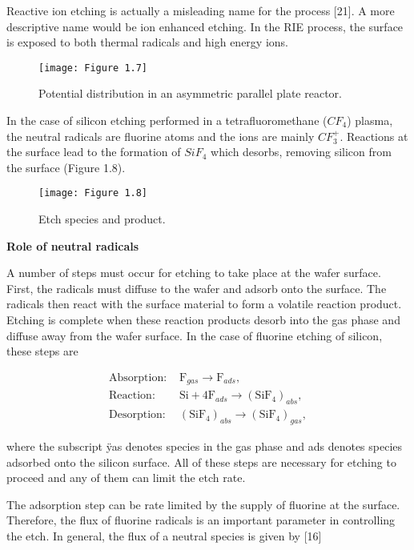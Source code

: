\tab Reactive ion etching is actually a misleading name for the process [21]. A more descriptive name would be ion enhanced etching. In the RIE process, the surface is exposed to both thermal radicals and high energy ions.

\begin{figure}[H]
	\centering
	\texttt{[image: Figure 1.7]}
	\bf\caption{Potential distribution in an asymmetric parallel plate reactor.}
	\label{fig:1.7}
\end{figure}

\noindent In the case of silicon etching performed in a tetrafluoromethane ($CF_{4}$) plasma, the neutral radicals are fluorine atoms and the ions are mainly $CF^{+}_{3}$. Reactions at the surface lead to the formation of $SiF_{4}$ which desorbs, removing silicon from the surface (Figure 1.8).

\begin{figure}[H]
	\centering
	\texttt{[image: Figure 1.8]}
	\bf\caption{Etch species and product.}
	\label{fig:1.8}
\end{figure}

\large\bf Role of neutral radicals
\vspace{.5cm}

\normalfont\normalsize A number of steps must occur for etching to take place at the wafer surface. First, the radicals must diffuse to the wafer and adsorb onto the surface. The radicals then react with the surface material to form a volatile reaction product. Etching is complete when these reaction products desorb into the gas phase and diffuse away from the wafer surface. In the case of fluorine etching of silicon, these steps are

\begin{align}
	\text{Absorption: }& \text{F}_{gas} \rightarrow \text{F}_{ads}, \\
	\text{Reaction: }& \text{Si}+4\text{F}_{ads} \rightarrow \left( \text{SiF}_{4}\right)_{abs}, \\
	\text{Desorption: }& \left( \text{SiF}_{4}\right)_{abs} \rightarrow \left( \text{SiF}_{4}\right)_{gas},
\end{align}

\noindent where the subscript ÿas denotes species in the gas phase and ads denotes species adsorbed onto the silicon surface. All of these steps are necessary for etching to proceed and any of them can limit the etch rate.

The adsorption step can be rate limited by the supply of fluorine at the surface. Therefore, the flux of fluorine radicals is an important parameter in controlling the etch. In general, the flux of a neutral species is given by [16]


